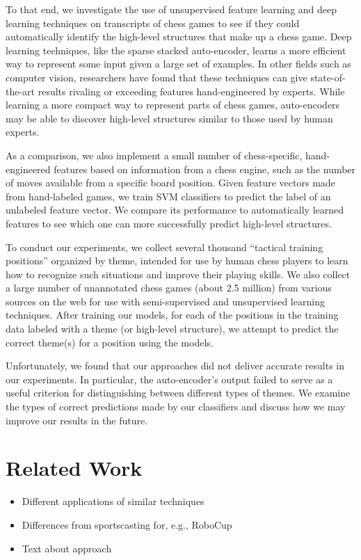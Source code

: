 \documentclass[11pt]{article}
\begin{document}
To that end, we investigate the use of unsupervised feature learning and deep learning techniques on transcripts of chess games to see if they could automatically identify the high-level structures that make up a chess game. Deep learning techniques, like the sparse stacked auto-encoder, learns a more efficient way to represent some input given a large set of examples. In other fields such as computer vision, researchers have found that these techniques can give state-of-the-art results rivaling or exceeding features hand-engineered by experts. While learning a more compact way to represent parts of chess games, auto-encoders may be able to discover high-level structures similar to those used by human experts.

As a comparison, we also implement a small number of chess-specific, hand-engineered features based on information from a chess engine, such as the number of moves available from a specific board position. Given feature vectors made from hand-labeled games, we train SVM classifiers to predict the label of an unlabeled feature vector. We compare its performance to automatically learned features to see which one can more successfully predict high-level structures.

To conduct our experiments, we collect several thousand ``tactical training positions'' organized by theme, intended for use by human chess players to learn how to recognize such situations and improve their playing skills. We also collect a large number of unannotated chess games (about 2.5 million) from various sources on the web for use with semi-supervised and unsupervised learning techniques. After training our models, for each of the positions in the training data labeled with a theme (or high-level structure), we attempt to predict the correct theme(s) for a position using the models.

Unfortunately, we found that our approaches did not deliver accurate results in our experiments. In particular, the auto-encoder's output failed to serve as a useful criterion for distinguishing between different types of themes. We examine the types of correct predictions made by our classifiers and discuss how we may improve our results in the future.

\section{Related Work}
\begin{itemize}
\item Different applications of similar techniques
\item Differences from sportscasting for, e.g., RoboCup
\item Text about approach
\end{itemize}
\end{document}
